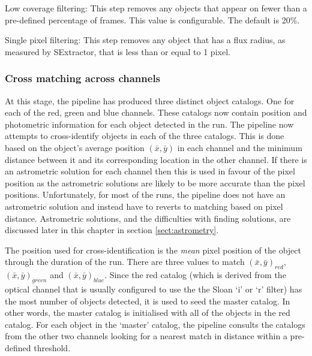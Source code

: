 Low coverage filtering: This step removes any objects that appear on fewer than a pre-defined percentage of frames. This value is configurable. The default is 20\%. 

Single pixel filtering: This step removes any object that has a flux radius, as measured by SExtractor, that is less than or equal to 1 pixel.

\subsubsection{Cross matching across channels}
At this stage, the pipeline has produced three distinct object catalogs. One for each of the red, green and blue channels. These catalogs now contain position and photometric information for each object detected in the run.  The pipeline now attempts to cross-identify objects in each of the three catalogs. This is done based on the object's average position $(\bar{x}, \bar{y})$ in each channel and the minimum distance between it and its corresponding location in the other channel. If there is an astrometric solution for each channel then this is used in favour of the pixel position as the astrometric solutions are likely to be more accurate than the pixel positions. Unfortunately, for most of the runs, the pipeline does not have an astrometric solution and instead have to reverts to matching based on pixel distance. Astrometric solutions, and the difficulties with finding solutions, are discussed later in this chapter in section \ref{sect:astrometry}.

The position used for cross-identification is the \emph{mean} pixel position of the object through the duration of the run. There are three values to match $(\bar{x}, \bar{y})_{red}$, $(\bar{x}, \bar{y})_{green}$ and $(\bar{x}, \bar{y})_{blue}$. Since the red catalog (which is derived from the optical channel that is usually configured to use the the Sloan `i' or `r' filter) has the most number of objects detected, it is used to seed the master catalog. In other words, the master catalog is initialised with all of the objects in the red catalog. For each object in the `master' catalog, the pipeline consults the catalogs from the other two channels looking for a nearest match in distance within a pre-defined threshold.

